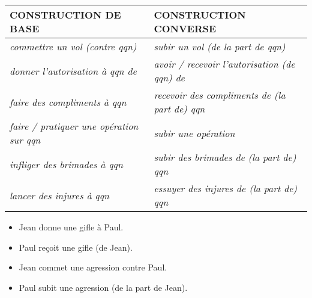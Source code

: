 \documentclass[UTF8]{report}
\begin{document}
\begin{table}[H]
    \centering
    \begin{tabular}{|l|l|}
    \hline
    \rowcolor{cyan!20}
    \textbf{CONSTRUCTION DE BASE} & \textbf{CONSTRUCTION CONVERSE} \\
    \hline
    \textit{commettre un vol (contre qqn)} & \textit{subir un vol (de la part de qqn)} \\
    \hline
    \textit{donner l'autorisation à qqn de} & \textit{avoir / recevoir l'autorisation (de qqn) de} \\
    \hline
    \textit{faire des compliments à qqn} & \textit{recevoir des compliments de (la part de) qqn} \\
    \hline
    \textit{faire / pratiquer une opération sur qqn} & \textit{subir une opération} \\
    \hline
    \textit{infliger des brimades à qqn} & \textit{subir des brimades de (la part de) qqn} \\
    \hline
    \textit{lancer des injures à qqn} & \textit{essuyer des injures de (la part de) qqn} \\
    \hline
    \end{tabular}
\end{table}
\begin{itemize}
    \item Jean donne une gifle à Paul.
    \item Paul reçoit une gifle (de Jean).
    \item Jean commet une agression contre Paul.
    \item Paul subit une agression (de la part de Jean).
\end{itemize}
\end{document}
